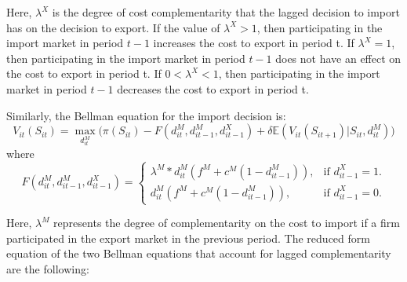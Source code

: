 \documentclass[12pt]{article}
\begin{document}

Here, $\lambda^{X}$ is the degree of cost complementarity that the
lagged decision to import has on the decision to export. If the value
of $\lambda^{X} > 1$, then participating in the import market in
period $t-1$ increases the cost to export in period t. If
$\lambda^{X}=1$, then participating in the import market in
period $t-1$ does not have an effect on the cost to export in period t.
If $0<\lambda^{X}< 1$,     then participating in the import market in
period $t-1$ decreases the cost to export in period t.


Similarly, the Bellman equation for the import decision is: 
\begin{equation}
V_{it}(S_{it})= \underset{d_{it}^{M}}{\max}\big(\pi(S_{it}) - F(d_{it}^{M},d_{it-1}^{M}, d_{it-1}^{X})  + \delta \mathbb{E} (V_{it}(S_{it+1})|S_{it}, d_{it}^{M})\Big)
\end{equation}
where 
\begin{equation}
  F(d_{it}^{M},d_{it-1}^{M}, d_{it-1}^{X})=\begin{cases}
   \lambda^{M} * d_{it}^{M}( f^{M} +c^{M}(1-d_{it-1}^{M})), & \text{if $d_{it-1}^{X}= 1$}.\\
   d_{it}^{M}( f^{M} +c^{M}(1-d_{it-1}^{M})) , & \text{if $d_{it-1}^{X}= 0$}.
  \end{cases}
\end{equation}

Here, $\lambda^{M}$ represents the degree of complementarity on the
cost to import if a firm participated in
the export market in the previous period. The reduced form
equation of the two Bellman equations that account for lagged
complementarity are the following:\\
\end{document}
